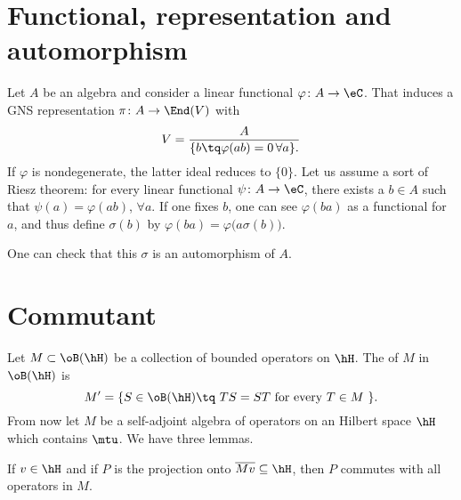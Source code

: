 
					\section{Functional, representation and automorphism}

Let $A$ be an algebra and consider a linear functional $\varphi\colon A\to \eC$. That induces a GNS representation $\pi\colon A\to \End(V)$ with
\begin{equation}
  V=\frac{ A }{ \{ b\tq\varphi(ab)=0\,\forall a \}. }
\end{equation}
If $\varphi$ is nondegenerate, the latter ideal reduces to $\{ 0 \}$. Let us assume a sort of Riesz theorem: for every linear functional $\psi\colon A\to \eC$, there exists a $b\in A$ such that $\psi(a)=\varphi(ab)$, $\forall a$. If one fixes $b$, one can see $\varphi(ba)$ as a functional for $a$, and thus define $\sigma(b)$ by
$\varphi(ba)=\varphi\big(a\sigma(b)\big)$.

One can check that this $\sigma$ is an automorphism of $A$.

\section{Commutant}

Let $M\subset\oB(\hH)$ be a collection of bounded operators on $\hH$. The  of $M$ in $\oB(\hH)$ is
\begin{equation}
M'=\{ S\in\oB(\hH)\tq \text{ $TS=ST$ for every $T\in M$ } \}.
\end{equation}
From now let $M$ be a self-adjoint algebra of operators on an Hilbert space $\hH$ which contains $\mtu$. We have three lemmas.

\begin{lemma}		\label{LemUnVN}
If $v\in\hH$ and if $P$ is the projection onto $\overline{ Mv }\subseteq \hH$, then $P$ commutes with all operators in $M$. 
\end{lemma}

